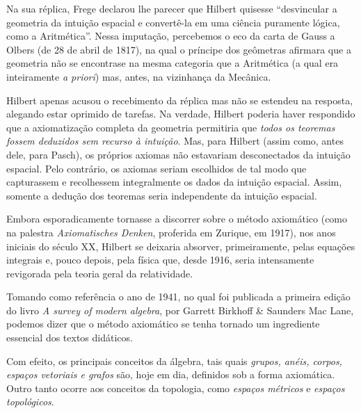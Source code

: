 \documentclass{hipatia}
\begin{document}
Na sua réplica, Frege declarou lhe parecer que Hilbert quisesse ``desvincular a geometria da intuição espacial e convertê-la em uma ciência puramente lógica, como a Aritmética''. Nessa imputação, percebemos o eco da carta de Gauss a Olbers  (de 28 de abril de 1817), na qual o príncipe dos geômetras afirmara que a geometria não se encontrase na mesma categoria que a Aritmética  (a qual era inteiramente \emph{a priori})  mas, antes, na vizinhança da Mecânica. \cite[p. 117]{corry1997a}\cite[p. 113]{mosterin1984}\cite[p. 382]{belna2002}  

Hilbert apenas acusou o recebimento da réplica mas não se estendeu na resposta, alegando estar oprimido de tarefas. Na verdade, Hilbert poderia haver respondido que a axiomatização completa da geometria permitiria que \emph{todos os teoremas fossem deduzidos sem recurso à intuição}. Mas, para Hilbert (assim como, antes dele, para Pasch), os próprios axiomas não estavariam desconectados da intuição espacial. Pelo contrário, os axiomas seriam escolhidos de tal modo que capturassem e recolhessem integralmente os dados da intuição espacial. Assim, somente a dedução dos teoremas seria independente da intuição espacial. \cite[p. 117]{corry1997a}

Embora esporadicamente tornasse a discorrer sobre o método axiomático (como na palestra \emph{Axiomatisches Denken}, proferida em Zurique, em 1917), nos anos iniciais do século XX, Hilbert se deixaria absorver, primeiramente, pelas equações integrais e, pouco depois, pela física que, desde 1916, seria intensamente revigorada pela teoria geral da relatividade.

Tomando como referência o ano de 1941, no qual foi publicada a primeira edição do livro \emph{A survey of modern algebra}, por Garrett Birkhoff \& Saunders Mac Lane, podemos dizer que o método axiomático se tenha tornado um ingrediente essencial dos textos didáticos.

Com efeito, os principais conceitos da álgebra, tais quais \emph{grupos, anéis, corpos, espaços vetoriais e grafos} são, hoje em dia, definidos sob a forma axiomática. Outro tanto ocorre aos conceitos da topologia, como \emph{espaços métricos} e \emph{espaços topológicos}.
\end{document}
